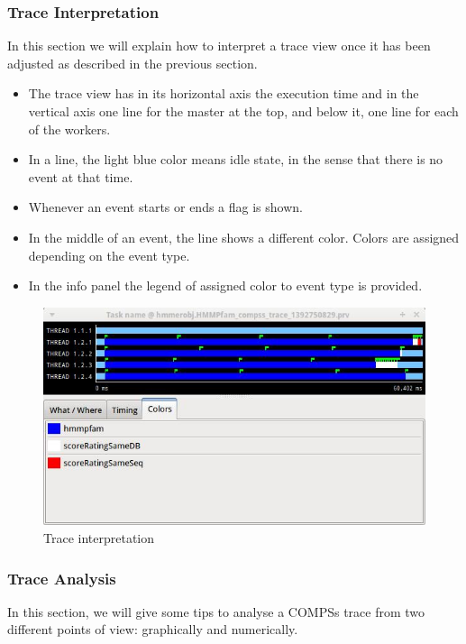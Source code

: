 \subsubsection{Trace Interpretation}
In this section we will explain how to interpret a trace view once it has been adjusted as 
described in the previous section.

\begin{itemize}
 \item The trace view has in its horizontal axis the execution time and in the vertical 
       axis one line for the master at the top, and below it, one line for each of the workers.
 \item In a line, the light blue color means idle state, in the sense that there is no event at that time.
 \item Whenever an event starts or ends a flag is shown.
 \item In the middle of an event, the line shows a different color. Colors are assigned depending on the event type.
 \item In the info panel the legend of assigned color to event type is provided.
\end{itemize}

\begin{figure}[ht!]
  \centering
    \includegraphics[width=\textwidth]{./Sections/4_Tools/Figures/7.jpeg}
    \caption{Trace interpretation}
\end{figure}


\subsubsection{Trace Analysis}
In this section, we will give some tips to analyse a COMPSs trace from two different points of view:
graphically and numerically.

